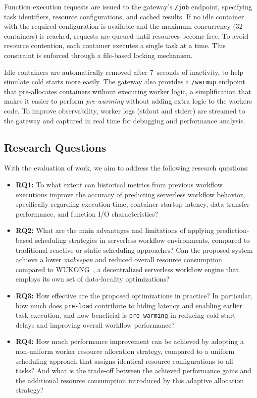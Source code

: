 \documentclass[conference]{IEEEtran}
\begin{document}
Function execution requests are issued to the gateway's \texttt{/job} endpoint, specifying task identifiers, resource configurations, and cached results. If no idle container with the required configuration is available and the maximum concurrency (32 containers) is reached, requests are queued until resources become free. To avoid resource contention, each container executes a single task at a time. This constraint is enforced through a file-based locking mechanism.

Idle containers are automatically removed after 7~seconds of inactivity, to help simulate cold starts more easily. The gateway also provides a \texttt{/warmup} endpoint that pre-allocates containers without executing worker logic, a simplification that makes it easier to perform \textit{pre-warming} without adding extra logic to the workers code. To improve observability, worker logs (stdout and stderr) are streamed to the gateway and captured in real time for debugging and performance analysis.

\subsection{Research Questions}

With the evaluation of work, we aim to address the following research questions:

\begin{itemize}
\item \textbf{RQ1:} To what extent can historical metrics from previous workflow executions improve the accuracy of predicting serverless workflow behavior, specifically regarding execution time, container startup latency, data transfer performance, and function I/O characteristics?

\item \textbf{RQ2:} What are the main advantages and limitations of applying prediction-based scheduling strategies in serverless workflow environments, compared to traditional reactive or static scheduling approaches? Can the proposed system achieve a lower \textit{makespan} and reduced overall resource consumption compared to WUKONG~\cite{wukong_2}, a decentralized serverless workflow engine that employs its own set of data-locality optimizations?

\item \textbf{RQ3:} How effective are the proposed optimizations in practice? In particular, how much does \texttt{pre-load} contribute to hiding latency and enabling earlier task execution, and how beneficial is \texttt{pre-warming} in reducing cold-start delays and improving overall workflow performance?

\item \textbf{RQ4:} How much performance improvement can be achieved by adopting a non-uniform worker resource allocation strategy, compared to a uniform scheduling approach that assigns identical resource configurations to all tasks? And what is the trade-off between the achieved performance gains and the additional resource consumption introduced by this adaptive allocation strategy?
\end{itemize}
\end{document}
